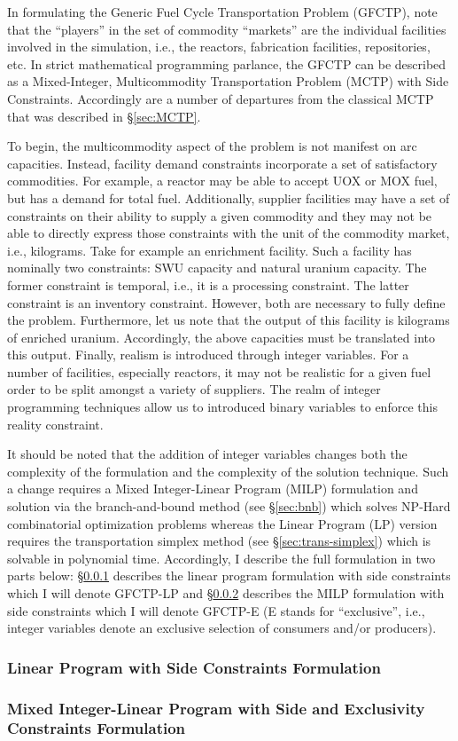 In formulating the Generic Fuel Cycle Transportation Problem (GFCTP), note that
the ``players'' in the set of commodity ``markets'' are the individual
facilities involved in the simulation, i.e., the reactors, fabrication
facilities, repositories, etc. In strict mathematical programming parlance, the
GFCTP can be described as a Mixed-Integer, Multicommodity Transportation Problem
(MCTP) with Side Constraints. Accordingly are a number of departures from the
classical MCTP that was described in \S\ref{sec:MCTP}.

To begin, the multicommodity aspect of the problem is not manifest on arc
capacities. Instead, facility demand constraints incorporate a set of
satisfactory commodities. For example, a reactor may be able to accept UOX or
MOX fuel, but has a demand for total fuel. Additionally, supplier facilities may
have a set of constraints on their ability to supply a given commodity and they
may not be able to directly express those constraints with the unit of the
commodity market, i.e., kilograms. Take for example an enrichment facility. Such
a facility has nominally two constraints: SWU capacity and natural uranium
capacity. The former constraint is temporal, i.e., it is a processing
constraint. The latter constraint is an inventory constraint. However, both are
necessary to fully define the problem. Furthermore, let us note that the output
of this facility is kilograms of enriched uranium. Accordingly, the above
capacities must be translated into this output. Finally, realism is introduced
through integer variables. For a number of facilities, especially reactors, it
may not be realistic for a given fuel order to be split amongst a variety of
suppliers. The realm of integer programming techniques allow us to introduced
binary variables to enforce this reality constraint.

It should be noted that the addition of integer variables changes both the
complexity of the formulation and the complexity of the solution technique. Such
a change requires a Mixed Integer-Linear Program (MILP) formulation and solution
via the branch-and-bound method (see \S\ref{sec:bnb}) which solves NP-Hard
combinatorial optimization problems whereas the Linear Program (LP) version
requires the transportation simplex method (see \S\ref{sec:trans-simplex})
which is solvable in polynomial time.  Accordingly, I describe the full
formulation in two parts below: \S\ref{sec:GFCTP-LP} describes the linear
program formulation with side constraints which I will denote GFCTP-LP
and \S\ref{sec:GFCTP-E} describes the MILP formulation with side constraints
which I will denote GFCTP-E (E stands for ``exclusive'', i.e., integer variables
denote an exclusive selection of consumers and/or producers).

\subsubsection{Linear Program with Side Constraints Formulation}\label{sec:GFCTP-LP}



\subsubsection{Mixed Integer-Linear Program with Side and Exclusivity Constraints Formulation}\label{sec:GFCTP-E}


